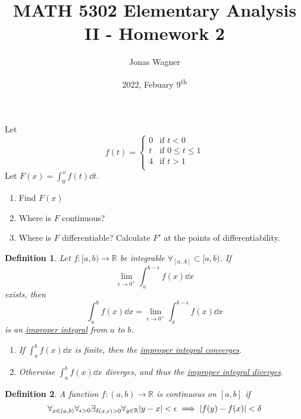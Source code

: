 \documentclass[]{article}
\title{MATH 5302 Elementary Analysis II - Homework 2}
\author{Jonas Wagner}
\date{2022, Febuary 9\textsuperscript{th}}
\newcommand{\R}{\mathbb{R}}
\newtheorem{definition}{Definition}
\begin{document}
\maketitle

\section{}
Let\[
    f(t) = \begin{cases}
        0 &\text{if } t<0\\
        t &\text{if } 0 \leq t \leq 1\\
        4 &\text{if } t>1\\
    \end{cases}
\] Let $F(x) = \int_{0}^{x} f(t) \dd t$.

\begin{enumerate}
    \item Find $F(x)$
    \item Where is $F$ continuous?
    \item Where is $F$ differentiable? Calculate $F'$ at the points of differentiability.
\end{enumerate}

\begin{definition}\label{def:int_improp_a_b}
    Let $f : [a,b) \to \R$ be integrable $\forall_[a,A] \subset [a,b)$.
    If \[
        \lim_{\epsilon\to 0^{+}} \int_{a}^{b-\epsilon} f(x) \dd{x}
    \] exists, then \[
        \int_{a}^{b} f(x) \dd{x} = \lim_{\epsilon\to 0^{+}} \int_{a}^{b-\epsilon} f(x) \dd{x}
    \] is an \underline{\emph{improper integral}} from $a$ to $b$.
    \begin{enumerate}
        \item If $\int_{a}^{b} f(x) \dd{x}$ is finite, then the \emph{\underline{improper integral converges}}.
        \item Otherwise $\int_{a}^{b} f(x) \dd{x}$ diverges, and thus the \emph{\underline{improper integral diverges}}.
    \end{enumerate}
\end{definition}

\begin{definition}\label{def:cont_fun}
    A function $f : (a,b) \to \R$ is continuous on $[a,b]$ if 
    \[
        \forall_{x\in (a,b)} \forall_{\epsilon>0} \exists_{\delta(x,\epsilon)>0} \forall_{y\in \R} \abs{y-x} < \epsilon \implies \abs{f(y)-f(x)} < \delta
    \]
\end{definition}
\end{document}

